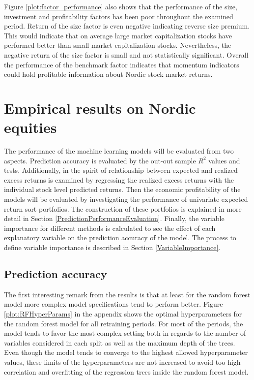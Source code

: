\documentclass[12pt]{article}
\begin{document}
Figure \ref{plot:factor_performance} also shows that the performance of the size, investment and profitability factors has been poor throughout the examined period. Return of the size factor is even negative indicating reverse size premium. This would indicate that on average large market capitalization stocks have performed better than small market capitalization stocks. Nevertheless, the negative return of the size factor is small and not statistically significant. Overall the performance of the benchmark factor indicates that momentum indicators could hold profitable information about Nordic stock market returns. \par

\section{Empirical results on Nordic equities}

The performance of the machine learning models will be evaluated from two aspects. Prediction accuracy is evaluated by the out-out sample $R^2$ values and \citet{Diebold1995} tests. Additionally, in the spirit of \citet{Lewellen2015} relationship between expected and realized excess returns is examined by regressing the realized excess returns with the individual stock level predicted returns.\footnotemark {} Then the economic profitability of the models will be evaluated by investigating the performance of univariate expected return sort portfolios. The construction of these portfolios is explained in more detail in Section \ref{PredictionPerformanceEvaluation}. Finally, the variable importance for different methods is calculated to see the effect of each explanatory variable on the prediction accuracy of the model. The process to define variable importance is described in Section \ref{VariableImportance}. \par

\subsection{Prediction accuracy}\label{PredictionAccuracy}

The first interesting remark from the results is that at least for the random forest model more complex model specifications tend to perform better. Figure \ref{plot:RFHyperParams} in the appendix shows the optimal hyperparameters for the random forest model for all retraining periods. For most of the periods, the model tends to favor the most complex setting both in regards to the number of variables considered in each split as well as the maximum depth of the trees. Even though the model tends to converge to the highest allowed hyperparameter values, these limits of the hyperparameters are not increased to avoid too high correlation and overfitting of the regression trees inside the random forest model. \par
\end{document}

